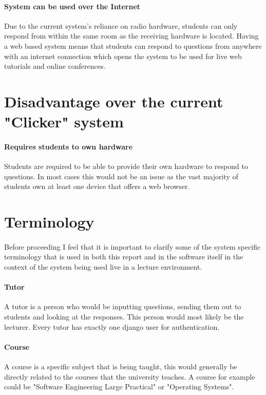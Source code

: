 \documentclass[10pt]{report}
\begin{document}
	\paragraph{System can be used over the Internet}
	Due to the current system's reliance on radio hardware, students can only respond from within the same
	room as the receiving hardware is located. Having a web based system means that students can respond
	to questions from anywhere with an internet connection which opens the system to be used for live web
	tutorials and online conferences.
	
	\section*{Disadvantage over the current "Clicker" system}
	\paragraph{Requires students to own hardware}
	Students are required to be able to provide their own hardware to respond to questions. In most cases
	this would not be an issue as the vast majority of students own at least one device that offers a web
	browser.
	
	\section*{Terminology}
	\paragraph{}
	Before proceeding I feel that it is important to clarify some of the system specific terminology that
	is used in both this report and in the software itself in the context of the system being used live
	in a lecture environment.
	
	\paragraph{Tutor}
	A tutor is a person who would be inputting questions, sending them out to students and looking at the
	responses. This person would most likely be the lecturer.  Every tutor has exactly one django user for
	authentication.
	
	\paragraph{Course}
	A course is a specific subject that is being taught, this would generally be directly related to the
	courses that the university teaches.  A course for example could be "Software Engineering Large
	Practical" or "Operating Systems".
	
\end{document}
